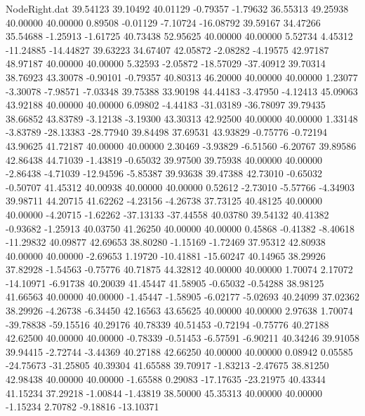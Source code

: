 \begin{filecontents}{NodeRight.dat}
  39.54123   39.10492   40.01129    -0.79357   -1.79632   36.55313   49.25938   40.00000   40.00000    0.89508   -0.01129   -7.10724  -16.08792
  39.59167   34.47266   35.54688    -1.25913   -1.61725   40.73438   52.95625   40.00000   40.00000    5.52734    4.45312  -11.24885  -14.44827
  39.63223   34.67407   42.05872    -2.08282   -4.19575   42.97187   48.97187   40.00000   40.00000    5.32593   -2.05872  -18.57029  -37.40912
  39.70314   38.76923   43.30078    -0.90101   -0.79357   40.80313   46.20000   40.00000   40.00000    1.23077   -3.30078   -7.98571   -7.03348
  39.75388   33.90198   44.44183    -3.47950   -4.12413   45.09063   43.92188   40.00000   40.00000    6.09802   -4.44183  -31.03189  -36.78097
  39.79435   38.66852   43.83789    -3.12138   -3.19300   43.30313   42.92500   40.00000   40.00000    1.33148   -3.83789  -28.13383  -28.77940
  39.84498   37.69531   43.93829    -0.75776   -0.72194   43.90625   41.72187   40.00000   40.00000    2.30469   -3.93829   -6.51560   -6.20767
  39.89586   42.86438   44.71039    -1.43819   -0.65032   39.97500   39.75938   40.00000   40.00000   -2.86438   -4.71039  -12.94596   -5.85387
  39.93638   39.47388   42.73010    -0.65032   -0.50707   41.45312   40.00938   40.00000   40.00000    0.52612   -2.73010   -5.57766   -4.34903
  39.98711   44.20715   41.62262    -4.23156   -4.26738   37.73125   40.48125   40.00000   40.00000   -4.20715   -1.62262  -37.13133  -37.44558
  40.03780   39.54132   40.41382    -0.93682   -1.25913   40.03750   41.26250   40.00000   40.00000    0.45868   -0.41382   -8.40618  -11.29832
  40.09877   42.69653   38.80280    -1.15169   -1.72469   37.95312   42.80938   40.00000   40.00000   -2.69653    1.19720  -10.41881  -15.60247
  40.14965   38.29926   37.82928    -1.54563   -0.75776   40.71875   44.32812   40.00000   40.00000    1.70074    2.17072  -14.10971   -6.91738
  40.20039   41.45447   41.58905    -0.65032   -0.54288   38.98125   41.66563   40.00000   40.00000   -1.45447   -1.58905   -6.02177   -5.02693
  40.24099   37.02362   38.29926    -4.26738   -6.34450   42.16563   43.65625   40.00000   40.00000    2.97638    1.70074  -39.78838  -59.15516
  40.29176   40.78339   40.51453    -0.72194   -0.75776   40.27188   42.62500   40.00000   40.00000   -0.78339   -0.51453   -6.57591   -6.90211
  40.34246   39.91058   39.94415    -2.72744   -3.44369   40.27188   42.66250   40.00000   40.00000    0.08942    0.05585  -24.75673  -31.25805
  40.39304   41.65588   39.70917    -1.83213   -2.47675   38.81250   42.98438   40.00000   40.00000   -1.65588    0.29083  -17.17635  -23.21975
  40.43344   41.15234   37.29218    -1.00844   -1.43819   38.50000   45.35313   40.00000   40.00000   -1.15234    2.70782   -9.18816  -13.10371

\end{filecontents}
